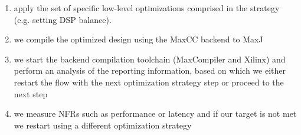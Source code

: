 \begin{enumerate}

\item apply the set of specific low-level optimizations comprised in
  the strategy (e.g. setting DSP balance).

\item  we compile the optimized
  design using the MaxCC backend to MaxJ

\item we start the backend compilation toolchain (MaxCompiler
  and Xilinx) and perform an analysis of the reporting information,
  based on which we either restart the flow with the next optimization
  strategy step or proceed to the next step

\item we measure NFRs such as performance or latency and if our target
  is not met we restart using a different optimization strategy

\end{enumerate}
